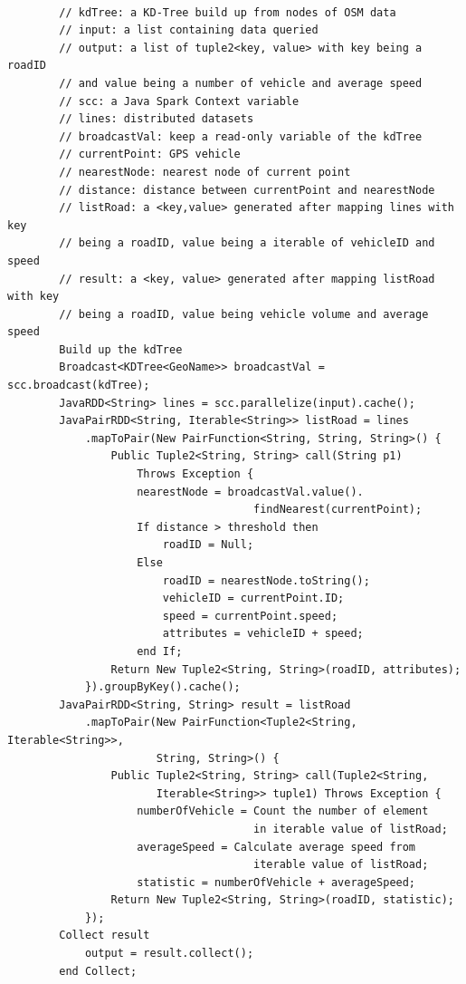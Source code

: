 \documentclass{acm_proc_article-sp}
\begin{document}
\begin{verbatim}
		
		// kdTree: a KD-Tree build up from nodes of OSM data
		// input: a list containing data queried
		// output: a list of tuple2<key, value> with key being a roadID 
		// and value being a number of vehicle and average speed
		// scc: a Java Spark Context variable
		// lines: distributed datasets
		// broadcastVal: keep a read-only variable of the kdTree
		// currentPoint: GPS vehicle 
		// nearestNode: nearest node of current point
		// distance: distance between currentPoint and nearestNode
		// listRoad: a <key,value> generated after mapping lines with key
		// being a roadID, value being a iterable of vehicleID and speed
		// result: a <key, value> generated after mapping listRoad with key 
		// being a roadID, value being vehicle volume and average speed
		Build up the kdTree
		Broadcast<KDTree<GeoName>> broadcastVal = scc.broadcast(kdTree);
		JavaRDD<String> lines = scc.parallelize(input).cache();
		JavaPairRDD<String, Iterable<String>> listRoad = lines
		    .mapToPair(New PairFunction<String, String, String>() {
		        Public Tuple2<String, String> call(String p1) 
		            Throws Exception {
		            nearestNode = broadcastVal.value().
		                              findNearest(currentPoint);	
		            If distance > threshold then
		                roadID = Null;
		            Else 
		                roadID = nearestNode.toString();
		                vehicleID = currentPoint.ID;
		                speed = currentPoint.speed;
		                attributes = vehicleID + speed;
		            end If;
		        Return New Tuple2<String, String>(roadID, attributes);
		    }).groupByKey().cache();
		JavaPairRDD<String, String> result = listRoad
		    .mapToPair(New PairFunction<Tuple2<String, Iterable<String>>, 
		               String, String>() {
		        Public Tuple2<String, String> call(Tuple2<String,
		               Iterable<String>> tuple1) Throws Exception {
		            numberOfVehicle = Count the number of element
		                              in iterable value of listRoad;
		            averageSpeed = Calculate average speed from
		                              iterable value of listRoad;
		            statistic = numberOfVehicle + averageSpeed;
		        Return New Tuple2<String, String>(roadID, statistic);
		    });
		Collect result
		    output = result.collect();
		end Collect;

\end{verbatim}
%
\noindent
\end{document}
